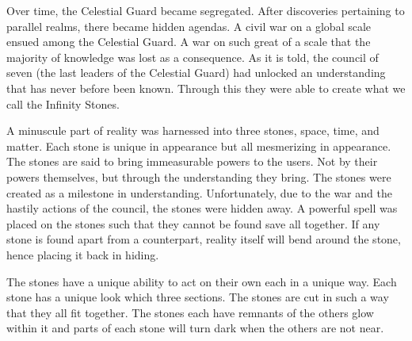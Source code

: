 Over time, the Celestial Guard became segregated. After discoveries pertaining to parallel realms, there became hidden agendas. A civil war on a global scale ensued among the Celestial Guard. A war on such great of a scale that the majority of knowledge was lost as a consequence. As it is told, the council of seven (the last leaders of the Celestial Guard) had unlocked an understanding that has never before been known. Through this they were able to create what we call the Infinity Stones. 

A minuscule part of reality was harnessed into three stones, space, time, and matter. Each stone is unique in appearance but all mesmerizing in appearance. The stones are said to bring immeasurable powers to the users. Not by their powers themselves, but through the understanding they bring. The stones were created as a milestone in understanding. Unfortunately, due to the war and the hastily actions of the council, the stones were hidden away. A powerful spell was placed on the stones such that they cannot be found save all together. If any stone is found apart from a counterpart, reality itself will bend around the stone, hence placing it back in hiding. 

The stones have a unique ability to act on their own each in a unique way. Each stone has a unique look which three sections. The stones are cut in such a way that they all fit together. The stones each have remnants of the others glow within it and parts of each stone will turn dark when the others are not near. 